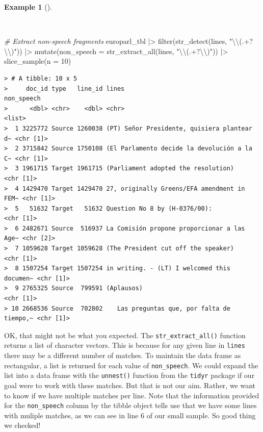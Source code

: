 \documentclass[
  letterpaper,
]{latex/krantz}
\newenvironment{Shaded}{\begin{snugshade}}{\end{snugshade}}
\newcommand{\AttributeTok}[1]{\textcolor[rgb]{0.00,0.00,0.00}{#1}}
\newcommand{\CommentTok}[1]{\textcolor[rgb]{0.00,0.00,0.00}{\textit{#1}}}
\newcommand{\DecValTok}[1]{\textcolor[rgb]{0.00,0.00,0.00}{#1}}
\newcommand{\FunctionTok}[1]{\textcolor[rgb]{0.00,0.00,0.00}{#1}}
\newcommand{\NormalTok}[1]{\textcolor[rgb]{0.00,0.00,0.00}{#1}}
\newcommand{\SpecialCharTok}[1]{\textcolor[rgb]{0.00,0.00,0.00}{#1}}
\newcommand{\StringTok}[1]{\textcolor[rgb]{0.00,0.00,0.00}{#1}}
\theoremstyle{definition}
\newtheorem{example}{Example}[chapter]
\theoremstyle{remark}
\begin{document}
\begin{example}[]\protect\hypertarget{exm-td-europarl-search-non-speech-2}{}\label{exm-td-europarl-search-non-speech-2}

~

\begin{Shaded}
\begin{Highlighting}[]
\CommentTok{\# Extract non{-}speech fragments}
\NormalTok{europarl\_tbl }\SpecialCharTok{|\textgreater{}}
  \FunctionTok{filter}\NormalTok{(}\FunctionTok{str\_detect}\NormalTok{(lines, }\StringTok{"}\SpecialCharTok{\textbackslash{}\textbackslash{}}\StringTok{(.+?}\SpecialCharTok{\textbackslash{}\textbackslash{}}\StringTok{)"}\NormalTok{)) }\SpecialCharTok{|\textgreater{}}
  \FunctionTok{mutate}\NormalTok{(}\AttributeTok{non\_speech =} \FunctionTok{str\_extract\_all}\NormalTok{(lines, }\StringTok{"}\SpecialCharTok{\textbackslash{}\textbackslash{}}\StringTok{(.+?}\SpecialCharTok{\textbackslash{}\textbackslash{}}\StringTok{)"}\NormalTok{)) }\SpecialCharTok{|\textgreater{}}
  \FunctionTok{slice\_sample}\NormalTok{(}\AttributeTok{n =} \DecValTok{10}\NormalTok{)}
\end{Highlighting}
\end{Shaded}

\begin{verbatim}
> # A tibble: 10 x 5
>     doc_id type   line_id lines                                       non_speech
>      <dbl> <chr>    <dbl> <chr>                                       <list>    
>  1 3225772 Source 1260038 (PT) Señor Presidente, quisiera plantear d~ <chr [1]> 
>  2 3715842 Source 1750108 (El Parlamento decide la devolución a la C~ <chr [1]> 
>  3 1961715 Target 1961715 (Parliament adopted the resolution)         <chr [1]> 
>  4 1429470 Target 1429470 27, originally Greens/EFA amendment in FEM~ <chr [1]> 
>  5   51632 Target   51632 Question No 8 by (H-0376/00):               <chr [1]> 
>  6 2482671 Source  516937 La Comisión propone proporcionar a las Age~ <chr [2]> 
>  7 1059628 Target 1059628 (The President cut off the speaker)         <chr [1]> 
>  8 1507254 Target 1507254 in writing. - (LT) I welcomed this documen~ <chr [1]> 
>  9 2765325 Source  799591 (Aplausos)                                  <chr [1]> 
> 10 2668536 Source  702802    Las preguntas que, por falta de tiempo,~ <chr [1]>
\end{verbatim}

\end{example}

OK, that might not be what you expected. The
\texttt{str\_extract\_all()} function returns a list of character
vectors. This is because for any given line in \texttt{lines} there may
be a different number of matches. To maintain the data frame as
rectangular, a list is returned for each value of \texttt{non\_speech}.
We could expand the list into a data frame with the \texttt{unnest()}
function from the \texttt{tidyr} package if our goal were to work with
these matches. But that is not our aim. Rather, we want to know if we
have multiple matches per line. Note that the information provided for
the \texttt{non\_speech} column by the tibble object tells use that we
have some lines with muliple matches, as we can see in line 6 of our
small sample. So good thing we checked!
\end{document}
